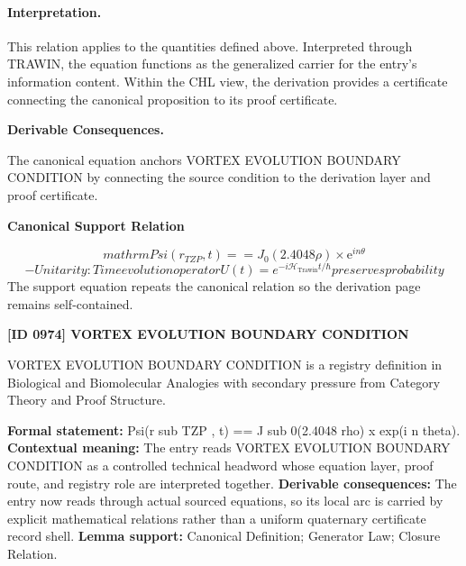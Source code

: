 \paragraph{Interpretation.}
This relation applies to the quantities defined above. Interpreted through TRAWIN, the equation functions as the generalized carrier for the entry’s information content. Within the CHL view, the derivation provides a certificate connecting the canonical proposition to its proof certificate.

\par\vspace{0.35em}
\noindent\textbf{Derivable Consequences.}\quad
\begingroup
\footnotesize
\raggedright
The canonical equation anchors VORTEX EVOLUTION BOUNDARY CONDITION by connecting the source condition to the derivation layer and proof certificate.
\par\endgroup

\noindent\textbf{Canonical Support Relation}\par
\[
mathrm{Psi}(r_{TZP}, t) == J_0(2.4048 \rho) \times \mathrm{e}^{i n \theta}
\]
\[
- Unitarity: Time evolution operator U(t) = e^{-i\mathcal{H}_{\mathrm{Trawin}} t/\hbar} preserves probability
\]
\noindent The support equation repeats the canonical relation so the derivation page remains self-contained.\par

\clearpage
\noindent\textbf{[ID 0974] VORTEX EVOLUTION BOUNDARY CONDITION}\par
\vspace{0.35em}
\begingroup\small
{}
VORTEX EVOLUTION BOUNDARY CONDITION is a registry definition in Biological and Biomolecular Analogies with secondary pressure from Category Theory and Proof Structure.

\begingroup\footnotesize\setlength{\emergencystretch}{3em}\sloppy
\textbf{Formal statement:} Psi(r sub TZP , t) == J sub 0(2.4048 rho) x exp(i n theta). \textbf{Contextual meaning:} The entry reads VORTEX EVOLUTION BOUNDARY CONDITION as a controlled technical headword whose equation layer, proof route, and registry role are interpreted together. \textbf{Derivable consequences:} The entry now reads through actual sourced equations, so its local arc is carried by explicit mathematical relations rather than a uniform quaternary certificate record shell. \textbf{Lemma support:} Canonical Definition; Generator Law; Closure Relation.\par
\endgroup

